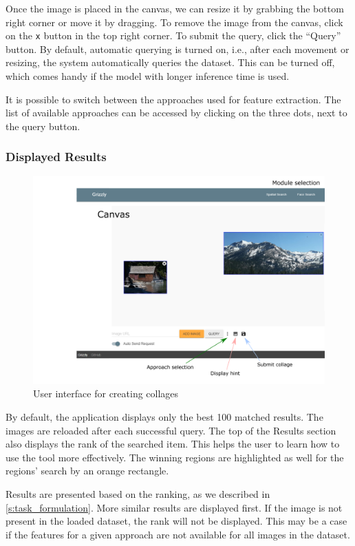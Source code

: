 Once the image is placed in the canvas, we can resize it by grabbing the bottom right corner or move it by dragging. To remove the image from the canvas, click on the \verb+x+ button in the top right corner. To submit the query, click the ``Query'' button. By default, automatic querying is turned on, i.e., after each movement or resizing, the system automatically queries the dataset. This can be turned off, which comes handy if the model with longer inference time is used.

It is possible to switch between the approaches used for feature extraction. The list of available approaches can be accessed by clicking on the three dots, next to the query button.

\subsubsection*{Displayed Results}

\begin{figure}
    \includegraphics[width=0.9\linewidth]{img/spatial_ui.png}
    \caption{User interface for creating collages}
    \label{fig:ui_collage}
\end{figure}

By default, the application displays only the best 100 matched results. The images are reloaded after each successful query. The top of the Results section also displays the rank of the searched item. This helps the user to learn how to use the tool more effectively. The winning regions are highlighted as well for the regions' search by an orange rectangle.

Results are presented based on the ranking, as we described in \autoref{s:task_formulation}. More similar results are displayed first. If the image is not present in the loaded dataset, the rank will not be displayed. This may be a case if the features for a given approach are not available for all images in the dataset.

